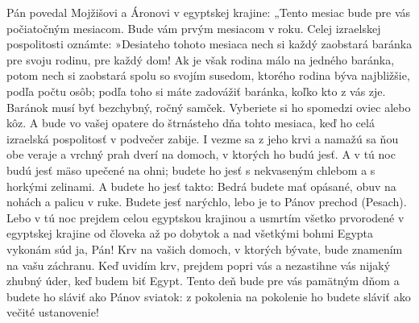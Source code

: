 Pán povedal Mojžišovi a Áronovi v egyptskej krajine: „Tento mesiac bude pre vás počiatočným mesiacom. Bude vám prvým mesiacom v roku. Celej izraelskej pospolitosti oznámte: 
\versseparator
»Desiateho tohoto mesiaca nech si každý zaobstará baránka pre svoju rodinu, pre každý dom! Ak je však rodina málo na jedného baránka, potom nech si zaobstará spolu so svojím susedom, ktorého rodina býva najbližšie, podľa počtu osôb; podľa toho si máte zadovážiť baránka, koľko kto z vás zje. 
\versseparator
Baránok musí byť bezchybný, ročný samček. Vyberiete si ho spomedzi oviec alebo kôz. A bude vo vašej opatere do štrnásteho dňa tohto mesiaca, keď ho celá izraelská pospolitosť v podvečer zabije. 
\versseparator
I vezme sa z jeho krvi a namažú sa ňou obe veraje a vrchný prah dverí na domoch, v ktorých ho budú jesť. 
A v tú noc budú jesť mäso upečené na ohni; budete ho jesť s nekvaseným chlebom a s horkými zelinami. 
\versseparator
A budete ho jesť takto: Bedrá budete mať opásané, obuv na nohách a palicu v ruke. Budete jesť narýchlo, lebo je to Pánov prechod (Pesach). 
\versseparator
Lebo v tú noc prejdem celou egyptskou krajinou a usmrtím všetko prvorodené v egyptskej krajine od človeka až po dobytok a nad všetkými bohmi Egypta vykonám súd ja, Pán! Krv na vašich domoch, v ktorých bývate, bude znamením na vašu záchranu. Keď uvidím krv, prejdem popri vás a nezastihne vás nijaký zhubný úder, keď budem biť Egypt. 
\versseparator
Tento deň bude pre vás pamätným dňom a budete ho sláviť ako Pánov sviatok: z pokolenia na pokolenie ho budete sláviť ako večité ustanovenie!